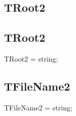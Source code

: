 \documentclass{report}
\newif\ifpdf
\begin{document}
\subsection*{\large{\textbf{TRoot2}}\normalsize\hspace{1ex}\hrulefill}
\else
\subsection*{TRoot2}
\fi
\label{ok_alias_string-TRoot2}
\begin{list}{}{
\setlength{\itemindent}{0cm}
\setlength{\listparindent}{0cm}
\setlength{\leftmargin}{\evensidemargin}
\addtolength{\leftmargin}{\tmplength}
\settowidth{\labelsep}{X}
\addtolength{\leftmargin}{\labelsep}
\setlength{\labelwidth}{\tmplength}
}
\item[\textbf{Declaration}\hfill]
\ifpdf
\begin{flushleft}
\fi
\begin{ttfamily}
TRoot2 = string;\end{ttfamily}

\ifpdf
\end{flushleft}
\fi

\end{list}
\ifpdf
\subsection*{\large{\textbf{TFileName2}}\normalsize\hspace{1ex}\hrulefill}
\else
\subsection*{TFileName2}
\fi
\label{ok_alias_string-TFileName2}
\begin{list}{}{
\setlength{\itemindent}{0cm}
\setlength{\listparindent}{0cm}
\setlength{\leftmargin}{\evensidemargin}
\addtolength{\leftmargin}{\tmplength}
\settowidth{\labelsep}{X}
\addtolength{\leftmargin}{\labelsep}
\setlength{\labelwidth}{\tmplength}
}
\item[\textbf{Declaration}\hfill]
\ifpdf
\begin{flushleft}
\fi
\begin{ttfamily}
TFileName2 = string;\end{ttfamily}

\ifpdf
\end{flushleft}
\fi

\end{list}
\end{document}
